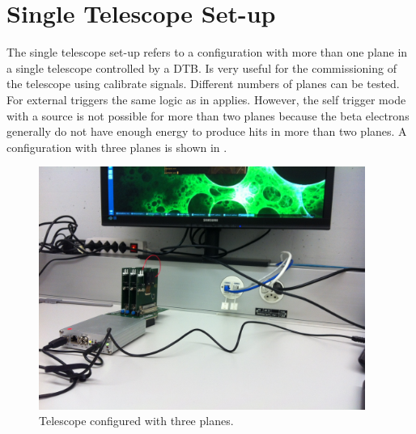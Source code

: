 \documentclass[british,11pt,a4paper]{memoir}
\begin{document}
\section{Single Telescope Set-up}
The single telescope set-up refers to a configuration with more than one plane in a single telescope controlled by a \ac{DTB}. Is very useful for the commissioning of the telescope using calibrate signals. Different numbers of planes can be tested. For external triggers the same logic as in  applies. However, the self trigger mode with a source is not possible for more than two planes because the beta electrons generally do not have enough energy to produce hits in more than two planes. A configuration with three planes is shown in .
\begin{figure}[ht]
	\centering
	\includegraphics[width=0.95\textwidth]{3planetel}
	\caption{Telescope configured with three planes.}
	\label{p3plane}
\end{figure}\no
\end{document}

